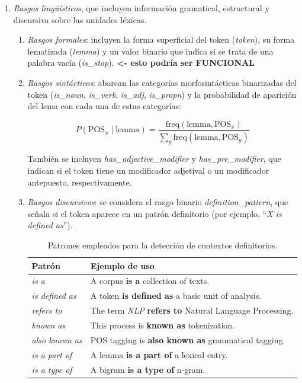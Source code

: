 \begin{enumerate}
  \item \emph{Rasgos lingüísticos}, que incluyen información gramatical, estructural y discursiva sobre las unidades léxicas.

  \begin{enumerate}
    \item \emph{Rasgos formales}: incluyen la forma superficial del token (\emph{token}), su forma lematizada (\emph{lemma}) y un valor binario que indica si se trata de una palabra vacía (\emph{is\_stop}). \textbf{<- esto podría ser FUNCIONAL}

    \item \emph{Rasgos sintácticos}: abarcan las categorías morfosintácticas binarizadas del token (\emph{is\_noun}, \emph{is\_verb}, \emph{is\_adj}, \emph{is\_propn}) y la probabilidad de aparición del lema con cada una de estas categorías:

    \begin{equation}
    P(\text{POS}_x \mid \text{lemma}) = \frac{\text{freq}(\text{lemma}, \text{POS}_x)}{\sum_{y} \text{freq}(\text{lemma}, \text{POS}_y)}
    \end{equation}

    También se incluyen \emph{has\_adjective\_modifier} y \emph{has\_pre\_modifier}, que indican si el token tiene un modificador adjetival o un modificador antepuesto, respectivamente.

    \item \emph{Rasgos discursivos}: se considera el rasgo binario \emph{definition\_pattern}, que señala si el token aparece en un patrón definitorio (por ejemplo, “\emph{X is defined as}”).

    \begin{table}[H]
\centering
\begin{tabular}{ll}
\toprule
\textbf{Patrón} & \textbf{Ejemplo de uso} \\
\midrule
\emph{is a} & A corpus \textbf{is a} collection of texts. \\
\emph{is defined as} & A token \textbf{is defined as} a basic unit of analysis. \\
\emph{refers to} & The term \emph{NLP} \textbf{refers to} Natural Language Processing. \\
\emph{known as} & This process is \textbf{known as} tokenization. \\
\emph{also known as} & POS tagging is \textbf{also known as} grammatical tagging. \\
\emph{is a part of} & A lemma \textbf{is a part of} a lexical entry. \\
\emph{is a type of} & A bigram \textbf{is a type of} n-gram. \\
\bottomrule
\end{tabular}
\caption{Patrones empleados para la detección de contextos definitorios.}
\label{tab:definition_patterns}
\end{table}


\end{enumerate}
\end{enumerate}
